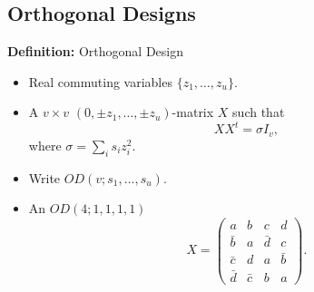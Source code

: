 \documentclass{beamer}
\newcommand{\abs}[1]{|#1|}
\begin{document}





\subsection{Orthogonal Designs}

\begin{frame}

  \begin{block}{{\bf Definition:} Orthogonal Design}
    \begin{itemize}
    \item Real commuting variables $\{z_1, \dots, z_u\}$.
    \item A $v \times v$ $(0,\pm z_1, \dots, \pm z_u)$-matrix $X$ such that
      \[
        XX^t = \sigma I_v,
      \]
      where $\sigma = \sum_i s_iz_i^2$.
    \item Write $OD(v; s_1, \dots, s_u)$.
    \end{itemize}
  \end{block}
  
\end{frame}

\begin{frame}

  \begin{itemize}
  \item An $OD(4;1,1,1,1)$
    \[
      X = 
      \begin{pmatrix}
        a & b & c & d \\
        \bar b & a & \bar d & c \\
        \bar c & d & a & \bar b \\
        \bar d & \bar c & b & a
      \end{pmatrix}.
    \]
  \end{itemize}
  
\end{frame}
\end{document}
